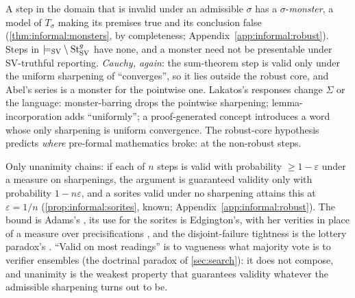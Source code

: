 A step in the domain that is invalid under an admissible $\sigma$ has a $\sigma$-\emph{monster}, a model of $T_\sigma$ making its premises true and its conclusion false (\cref{thm:informal:monsters}, by completeness; Appendix~\ref{app:informal:robust}). Steps in ${\models_{\mathrm{SV}}}\setminus\mathrm{St}^{g}_{\mathrm{SV}}$ have none, and a monster need not be presentable under SV-truthful reporting. \emph{Cauchy, again}: the sum-theorem step is valid only under the uniform sharpening of ``converges'', so it lies outside the robust core, and Abel's series is a monster for the pointwise one. Lakatos's responses change $\Sigma$ or the language: monster-barring drops the pointwise sharpening; lemma-incorporation adds ``uniformly''; a proof-generated concept introduces a word whose only sharpening is uniform convergence. The robust-core hypothesis predicts \emph{where} pre-formal mathematics broke: at the non-robust steps.

Only unanimity chains: if each of $n$ steps is valid with probability $\ge1-\varepsilon$ under a measure on sharpenings, the argument is guaranteed validity only with probability $1-n\varepsilon$, and a sorites valid under no sharpening attains this at $\varepsilon=1/n$ (\cref{prop:informal:sorites}, known; Appendix~\ref{app:informal:robust}). The bound is Adams's \citep{adams1966probability}, its use for the sorites is Edgington's, with her verities in place of a measure over precisifications \citep{edgington1997vagueness}, and the disjoint-failure tightness is the lottery paradox's \citep{kyburg1961probability}. ``Valid on most readings'' is to vagueness what majority vote is to verifier ensembles (the doctrinal paradox of \cref{sec:search}): it does not compose, and unanimity is the weakest property that guarantees validity whatever the admissible sharpening turns out to be.

